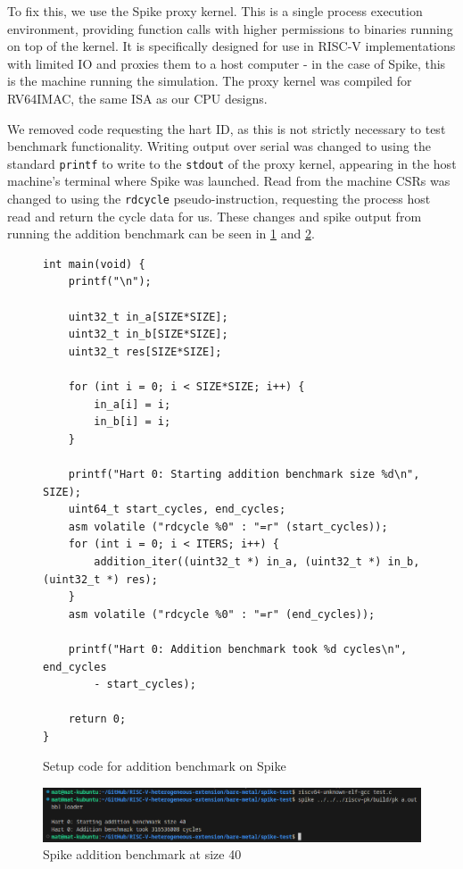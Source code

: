 To fix this, we use the Spike proxy kernel\cite{proxykernel}. This is a single process execution environment, providing function calls with higher permissions to binaries running on top of the kernel. It is specifically designed for use in RISC-V implementations with limited IO and proxies them to a host computer - in the case of Spike, this is the machine running the simulation. The proxy kernel was compiled for RV64IMAC, the same ISA as our CPU designs.

We removed code requesting the hart ID, as this is not strictly necessary to test benchmark functionality. Writing output over serial was changed to using the standard \texttt{printf} to write to the \texttt{stdout} of the proxy kernel, appearing in the host machine's terminal where Spike was launched. Read from the machine CSRs was changed to using the \texttt{rdcycle} pseudo-instruction, requesting the process host read and return the cycle data for us. These changes and spike output from running the addition benchmark can be seen in \ref{fig:spike-setup-code} and \ref{fig:spike_test_output}.

\begin{figure}[H]
    \centering
    \begin{verbatim}
int main(void) {
    printf("\n");

    uint32_t in_a[SIZE*SIZE];
    uint32_t in_b[SIZE*SIZE];
    uint32_t res[SIZE*SIZE];

    for (int i = 0; i < SIZE*SIZE; i++) {
        in_a[i] = i;
        in_b[i] = i;
    }

    printf("Hart 0: Starting addition benchmark size %d\n", SIZE);
    uint64_t start_cycles, end_cycles;
    asm volatile ("rdcycle %0" : "=r" (start_cycles));
    for (int i = 0; i < ITERS; i++) {
        addition_iter((uint32_t *) in_a, (uint32_t *) in_b, (uint32_t *) res);
    }
    asm volatile ("rdcycle %0" : "=r" (end_cycles));

    printf("Hart 0: Addition benchmark took %d cycles\n", end_cycles 
        - start_cycles);

    return 0;
}
    \end{verbatim}
    \caption{Setup code for addition benchmark on Spike}
    \label{fig:spike-setup-code}
\end{figure}

\begin{figure}[H]
    \centering
    \includegraphics[width=\textwidth]{img/spike_output.png}
    \caption{Spike addition benchmark at size 40}
    \label{fig:spike_test_output}
\end{figure}


